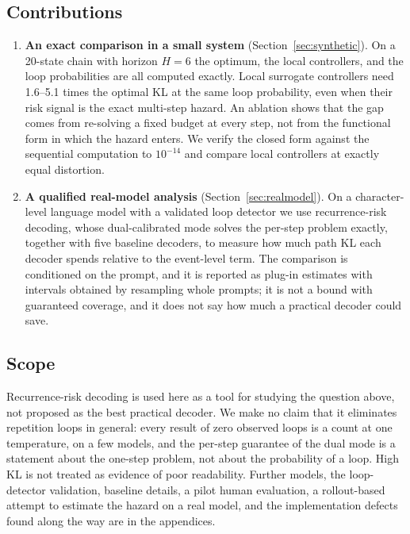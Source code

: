 \documentclass[11pt]{article}
\begin{document}
\subsection{Contributions}
\begin{enumerate}[leftmargin=*]
  \item \textbf{An exact comparison in a small system} (Section~\ref{sec:synthetic}). On a 20-state chain with horizon $H{=}6$ the optimum, the local controllers, and the loop probabilities are all computed exactly. Local surrogate controllers need 1.6--5.1 times the optimal KL at the same loop probability, even when their risk signal is the exact multi-step hazard. An ablation shows that the gap comes from re-solving a fixed budget at every step, not from the functional form in which the hazard enters. We verify the closed form against the sequential computation to $10^{-14}$ and compare local controllers at exactly equal distortion.
  \item \textbf{A qualified real-model analysis} (Section~\ref{sec:realmodel}). On a character-level language model with a validated loop detector we use recurrence-risk decoding, whose dual-calibrated mode solves the per-step problem exactly, together with five baseline decoders, to measure how much path KL each decoder spends relative to the event-level term. The comparison is conditioned on the prompt, and it is reported as plug-in estimates with intervals obtained by resampling whole prompts; it is not a bound with guaranteed coverage, and it does not say how much a practical decoder could save.
\end{enumerate}

\subsection{Scope}
Recurrence-risk decoding is used here as a tool for studying the question above, not proposed as the best practical decoder. We make no claim that it eliminates repetition loops in general: every result of zero observed loops is a count at one temperature, on a few models, and the per-step guarantee of the dual mode is a statement about the one-step problem, not about the probability of a loop. High KL is not treated as evidence of poor readability. Further models, the loop-detector validation, baseline details, a pilot human evaluation, a rollout-based attempt to estimate the hazard on a real model, and the implementation defects found along the way are in the appendices.

\end{document}
